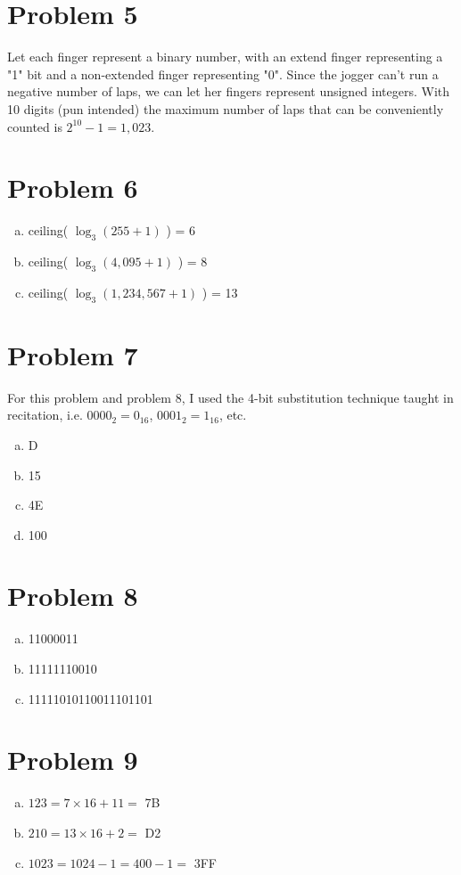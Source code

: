 \documentclass[11pt]{article}
\begin{document}
\section*{Problem 5}
Let each finger represent a binary number, with an extend finger representing a "1" bit and a non-extended finger representing "0". Since the jogger can't run a negative number of laps, we can let her fingers represent unsigned integers. With 10 digits (pun intended) the maximum number of laps that can be conveniently counted is $2^{10} -1 = 1,023$.

\section*{Problem 6}
\begin{enumerate}[(a)]
	\item ceiling( $\log _3 (255+1)$ ) = 6
	\item ceiling( $\log _3 (4,095+1)$ ) = 8
	\item ceiling( $\log _3 (1,234,567+1)$ ) = 13
\end{enumerate}

\section*{Problem 7}
For this problem and problem 8, I used the 4-bit substitution technique taught in recitation, i.e. $0000_2 = 0_{16}$, $0001_2 = 1_{16}$, etc.
\begin{enumerate}[(a)]
	\item D
	\item 15
	\item 4E
	\item 100
\end{enumerate}

\section*{Problem 8}
\begin{enumerate}[(a)]
	\item 11000011
	\item 11111110010
	\item 11111010110011101101
\end{enumerate}

\section*{Problem 9}
\begin{enumerate}[(a)]
	\item $123 = 7 \times 16 + 11 =$ 7B
	\item $210 = 13 \times 16 + 2 =$ D2
	\item $1023 = 1024 -1 = 400-1 = $ 3FF
\end{enumerate}
\end{document}
